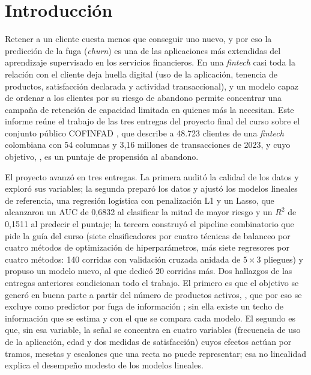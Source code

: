 \section{Introducción}
\label{sec:introduccion}

Retener a un cliente cuesta menos que conseguir uno nuevo, y por eso la predicción de la fuga (\emph{churn}) es
una de las aplicaciones más extendidas del aprendizaje supervisado en los servicios financieros. En una
\emph{fintech} casi toda la relación con el cliente deja huella digital (uso de la aplicación, tenencia de
productos, satisfacción declarada y actividad transaccional), y un modelo capaz de ordenar a los clientes por su
riesgo de abandono permite concentrar una campaña de retención de capacidad limitada en quienes más la
necesitan. Este informe reúne el trabajo de las tres entregas del proyecto final del curso sobre el conjunto
público COFINFAD \citep{cofinfad2025}, que describe a 48.723 clientes de una \emph{fintech} colombiana con 54
columnas y 3,16 millones de transacciones de 2023, y cuyo objetivo, \cp, es un puntaje de propensión al
abandono.

El proyecto avanzó en tres entregas. La primera auditó la calidad de los datos y exploró sus variables; la
segunda preparó los datos y ajustó los modelos lineales de referencia, una regresión logística con penalización
L1 y un Lasso, que alcanzaron un AUC de 0,6832 al clasificar la mitad de mayor riesgo y un $R^2$ de 0,1511 al
predecir el puntaje; la tercera construyó el pipeline combinatorio que pide la guía del curso (siete
clasificadores por cuatro técnicas de balanceo por cuatro métodos de optimización de hiperparámetros, más siete
regresores por cuatro métodos: 140 corridas con validación cruzada anidada de $5 \times 3$ pliegues) y propuso
un modelo nuevo, al que dedicó 20 corridas más. Dos hallazgos de las entregas anteriores condicionan todo el
trabajo. El primero es que el objetivo se generó en buena parte a partir del número de productos activos, \ap,
que por eso se excluye como predictor por fuga de información \citep{kaufman2012leakage}; sin ella existe un
techo de información que se estima y con el que se compara cada modelo. El segundo es que, sin esa variable, la
señal se concentra en cuatro variables (frecuencia de uso de la aplicación, edad y dos medidas de satisfacción)
cuyos efectos actúan por tramos, mesetas y escalones que una recta no puede representar; esa no linealidad
explica el desempeño modesto de los modelos lineales.

